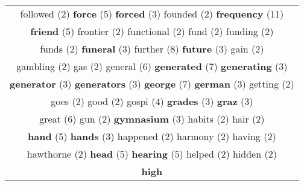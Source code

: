 \documentclass[12pt,a4paper]{article}
\begin{document}
\begin{center}
\begin{longtable}{|c|}
\\ {\footnotesize \textcolor{Verde} {followed}} \footnotesize{(2)} {\large \textcolor{Roxo} {\bf force}} \footnotesize{(5)} {\small \textcolor{Laranja} {\bf forced}} \footnotesize{(3)} {\footnotesize \textcolor{Verde} {founded}} \footnotesize{(2)} {\Huge \textcolor{AzulEscuro} {\bf frequency}} \footnotesize{(11)}  \\ {\large \textcolor{Roxo} {\bf friend}} \footnotesize{(5)} {\footnotesize \textcolor{Verde} {frontier}} \footnotesize{(2)} {\footnotesize \textcolor{Verde} {functional}} \footnotesize{(2)} {\footnotesize \textcolor{Verde} {fund}} \footnotesize{(2)} {\footnotesize \textcolor{Verde} {funding}} \footnotesize{(2)}  \\ {\footnotesize \textcolor{Verde} {funds}} \footnotesize{(2)} {\small \textcolor{Laranja} {\bf funeral}} \footnotesize{(3)} {\huge \textcolor{Amarelo} {further}} \footnotesize{(8)} {\small \textcolor{Laranja} {\bf future}} \footnotesize{(3)} {\footnotesize \textcolor{Verde} {gain}} \footnotesize{(2)}  \\ {\footnotesize \textcolor{Verde} {gambling}} \footnotesize{(2)} {\footnotesize \textcolor{Verde} {gas}} \footnotesize{(2)} {\Large \textcolor{VermEscuro} {general}} \footnotesize{(6)} {\LARGE \textcolor{Rosa} {\bf generated}} \footnotesize{(7)} {\small \textcolor{Laranja} {\bf generating}} \footnotesize{(3)}  \\ {\small \textcolor{Laranja} {\bf generator}} \footnotesize{(3)} {\small \textcolor{Laranja} {\bf generators}} \footnotesize{(3)} {\LARGE \textcolor{Rosa} {\bf george}} \footnotesize{(7)} {\small \textcolor{Laranja} {\bf german}} \footnotesize{(3)} {\footnotesize \textcolor{Verde} {getting}} \footnotesize{(2)}  \\ {\footnotesize \textcolor{Verde} {goes}} \footnotesize{(2)} {\footnotesize \textcolor{Verde} {good}} \footnotesize{(2)} {\normalsize \textcolor{VerdeLocao} {gospi}} \footnotesize{(4)} {\small \textcolor{Laranja} {\bf grades}} \footnotesize{(3)} {\small \textcolor{Laranja} {\bf graz}} \footnotesize{(3)}  \\ {\Large \textcolor{VermEscuro} {great}} \footnotesize{(6)} {\footnotesize \textcolor{Verde} {gun}} \footnotesize{(2)} {\small \textcolor{Laranja} {\bf gymnasium}} \footnotesize{(3)} {\footnotesize \textcolor{Verde} {habits}} \footnotesize{(2)} {\footnotesize \textcolor{Verde} {hair}} \footnotesize{(2)}  \\ {\large \textcolor{Roxo} {\bf hand}} \footnotesize{(5)} {\small \textcolor{Laranja} {\bf hands}} \footnotesize{(3)} {\footnotesize \textcolor{Verde} {happened}} \footnotesize{(2)} {\footnotesize \textcolor{Verde} {harmony}} \footnotesize{(2)} {\footnotesize \textcolor{Verde} {having}} \footnotesize{(2)}  \\ {\footnotesize \textcolor{Verde} {hawthorne}} \footnotesize{(2)} {\large \textcolor{Roxo} {\bf head}} \footnotesize{(5)} {\large \textcolor{Roxo} {\bf hearing}} \footnotesize{(5)} {\footnotesize \textcolor{Verde} {helped}} \footnotesize{(2)} {\footnotesize \textcolor{Verde} {hidden}} \footnotesize{(2)}  \\ {\Huge \textcolor{AzulEscuro} {\bf high}} 
\end{longtable}
\end{center}
\end{document}
